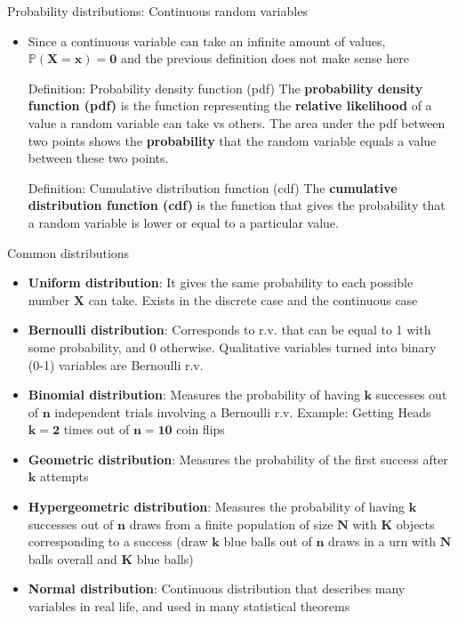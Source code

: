 \documentclass[
  ignorenonframetext,
  aspectratio=169]{beamer}
\providecommand{\tightlist}{%
  \setlength{\itemsep}{0pt}\setlength{\parskip}{0pt}}
\begin{document}
\begin{frame}{Probability distributions: Continuous random variables}
\protect\hypertarget{probability-distributions-continuous-random-variables}{}
\label{continuous}

\begin{itemize}
\tightlist
\item
  Since a continuous variable can take an infinite amount of values,
  \(\bm{\mathbb{P}(X=x) = 0}\) and the previous definition does not make
  sense here

  \begin{block}{Definition: Probability density function (pdf)}
  The \textbf{probability density function (pdf)} is the function representing the \textbf{relative likelihood} of a value a random variable can take vs others. The area under the pdf between two points shows the \textbf{probability} that the random variable equals a value between these two points.
  \end{block}
  \begin{block}{Definition: Cumulative distribution function (cdf)}
  The \textbf{cumulative distribution function (cdf)} is the function that gives the probability that a random variable is lower or equal to a particular value.
  \end{block}
\end{itemize}
\end{frame}

\begin{frame}{Common distributions}
\protect\hypertarget{common-distributions}{}
\small

\begin{itemize}
\tightlist
\item
  \textbf{Uniform distribution}: It gives the same probability to each
  possible number \(\bm{X}\) can take. Exists in the discrete case and
  the continuous case
\item
  \textbf{Bernoulli distribution}: Corresponds to r.v. that can be equal
  to 1 with some probability, and 0 otherwise. Qualitative variables
  turned into binary (0-1) variables are Bernoulli r.v.
\item
  \textbf{Binomial distribution}: Measures the probability of having
  \(\bm{k}\) successes out of \(\bm{n}\) independent trials involving a
  Bernoulli r.v. Example: Getting Heads \(\bm{k = 2}\) times out of
  \(\bm{n=10}\) coin flips
\item
  \textbf{Geometric distribution}: Measures the probability of the first
  success after \(\bm{k}\) attempts
\item
  \textbf{Hypergeometric distribution}: Measures the probability of
  having \(\bm{k}\) successes out of \(\bm{n}\) draws from a finite
  population of size \(\bm{N}\) with \(\bm{K}\) objects corresponding to
  a success (draw \(\bm{k}\) blue balls out of \(\bm{n}\) draws in a urn
  with \(\bm{N}\) balls overall and \(\bm{K}\) blue balls)
\item
  \textbf{Normal distribution}: Continuous distribution that describes
  many variables in real life, and used in many statistical theorems
\end{itemize}
\end{frame}
\end{document}
